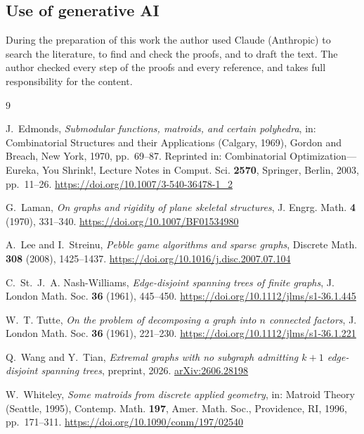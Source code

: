 \documentclass[11pt]{amsart}
\theoremstyle{definition}
\theoremstyle{remark}
\numberwithin{equation}{section}
\providecommand{\doi}[1]{\url{https://doi.org/#1}}
\begin{document}
\subsection*{Use of generative AI} During the preparation of this work the author used Claude (Anthropic) to search the literature, to find and check the proofs, and to draft the text. The author checked every step of the proofs and every reference, and takes full responsibility for the content.

\begin{thebibliography}{9}

J.~Edmonds, \emph{Submodular functions, matroids, and certain polyhedra}, in: Combinatorial Structures and their Applications (Calgary, 1969), Gordon and Breach, New York, 1970, pp.~69--87. Reprinted in: Combinatorial Optimization---Eureka, You Shrink!, Lecture Notes in Comput. Sci. \textbf{2570}, Springer, Berlin, 2003, pp.~11--26. \doi{10.1007/3-540-36478-1_2}

G.~Laman, \emph{On graphs and rigidity of plane skeletal structures}, J. Engrg. Math. \textbf{4} (1970), 331--340. \doi{10.1007/BF01534980}

A.~Lee and I.~Streinu, \emph{Pebble game algorithms and sparse graphs}, Discrete Math. \textbf{308} (2008), 1425--1437. \doi{10.1016/j.disc.2007.07.104}

C.~St.~J.~A. Nash-Williams, \emph{Edge-disjoint spanning trees of finite graphs}, J. London Math. Soc. \textbf{36} (1961), 445--450. \doi{10.1112/jlms/s1-36.1.445}

W.~T. Tutte, \emph{On the problem of decomposing a graph into $n$ connected factors}, J. London Math. Soc. \textbf{36} (1961), 221--230. \doi{10.1112/jlms/s1-36.1.221}

Q.~Wang and Y.~Tian, \emph{Extremal graphs with no subgraph admitting $k+1$ edge-disjoint spanning trees}, preprint, 2026. \href{https://arxiv.org/abs/2606.28198}{arXiv:2606.28198}

W.~Whiteley, \emph{Some matroids from discrete applied geometry}, in: Matroid Theory (Seattle, 1995), Contemp. Math. \textbf{197}, Amer. Math. Soc., Providence, RI, 1996, pp.~171--311. \doi{10.1090/conm/197/02540}

\end{thebibliography}
\end{document}
